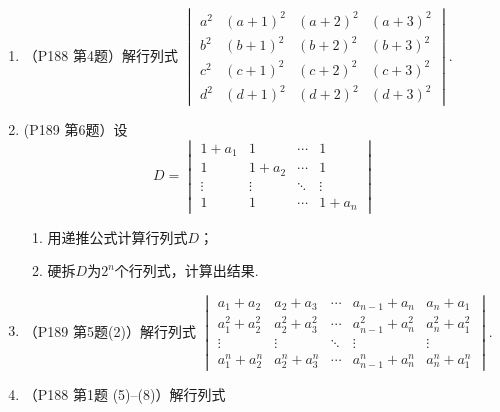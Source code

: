 \begin{enumerate}
    \item （P188 第4题）解行列式 $ \begin{vmatrix}
                  a^{2} & (a+1)^{2} & (a+2)^{2} & (a+3)^{2} \\
                  b^{2} & (b+1)^{2} & (b+2)^{2} & (b+3)^{2} \\
                  c^{2} & (c+1)^{2} & (c+2)^{2} & (c+3)^{2} \\
                  d^{2} & (d+1)^{2} & (d+2)^{2} & (d+3)^{2}
              \end{vmatrix} $.

    \item (P189 第6题）设
          \[ D=\begin{vmatrix}
                  1+a_1  & 1      & \cdots & 1      \\
                  1      & 1+a_2  & \cdots & 1      \\
                  \vdots & \vdots & \ddots & \vdots \\
                  1      & 1      & \cdots & 1+a_n
              \end{vmatrix} \]
          \begin{enumerate}
              \item 用递推公式计算行列式$D$；

              \item 硬拆$D$为$2^n$个行列式，计算出结果.
          \end{enumerate}

    \item （P189 第5题(2)）解行列式 $\begin{vmatrix}
                  a_{1}+a_{2}         & a_{2}+a_{3}         & \cdots & a_{n-1}+a_n         & a_n+a_{1}         \\
                  a_{1}^{2}+a_{2}^{2} & a_{2}^{2}+a_{3}^{2} & \cdots & a_{n-1}^{2}+a_n^{2} & a_n^{2}+a_{1}^{2} \\
                  \vdots              & \vdots              & \ddots & \vdots              & \vdots            \\
                  a_{1}^{n}+a_{2}^{n} & a_{2}^{n}+a_{3}^{n} & \cdots & a_{n-1}^{n}+a_n^{n} & a_n^{n}+a_{1}^{n}
              \end{vmatrix}$.

    \item （P188 第1题 (5)--(8)）解行列式
          \begin{enumerate} 
\end{enumerate}
\end{enumerate}
